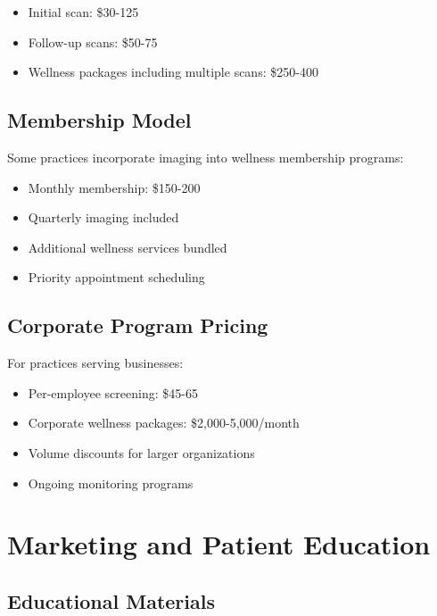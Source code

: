 \documentclass[
  Letterpaper,
]{scrbook}
\providecommand{\tightlist}{%
  \setlength{\itemsep}{0pt}\setlength{\parskip}{0pt}}\usepackage{longtable,booktabs,array}
\begin{document}
\begin{itemize}
\tightlist
\item
  Initial scan: \$30-125
\item
  Follow-up scans: \$50-75
\item
  Wellness packages including multiple scans: \$250-400
\end{itemize}

\subsection{Membership Model}\label{membership-model}

Some practices incorporate imaging into wellness membership programs:

\begin{itemize}
\tightlist
\item
  Monthly membership: \$150-200
\item
  Quarterly imaging included
\item
  Additional wellness services bundled
\item
  Priority appointment scheduling
\end{itemize}

\subsection{Corporate Program Pricing}\label{corporate-program-pricing}

For practices serving businesses:

\begin{itemize}
\tightlist
\item
  Per-employee screening: \$45-65
\item
  Corporate wellness packages: \$2,000-5,000/month
\item
  Volume discounts for larger organizations
\item
  Ongoing monitoring programs
\end{itemize}

\section{Marketing and Patient
Education}\label{marketing-and-patient-education}

\subsection{Educational Materials}\label{educational-materials}
\end{document}
